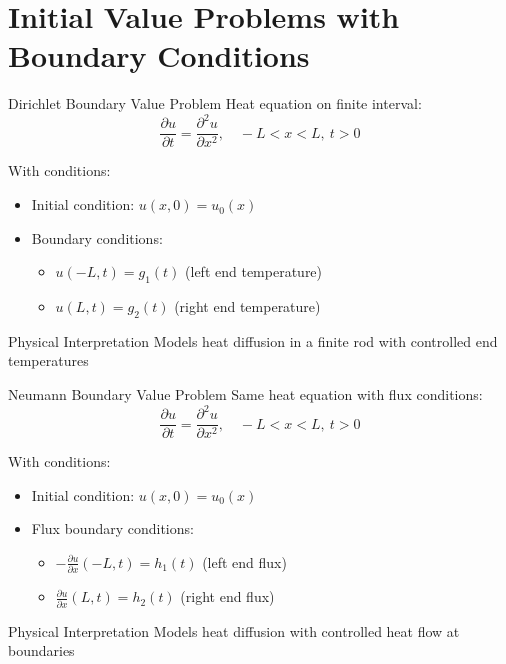 \documentclass{beamer}
\begin{document}
\section{Initial Value Problems with Boundary Conditions}

\begin{frame}{Dirichlet Boundary Value Problem}
    Heat equation on finite interval:
    \[
    \frac{\partial u}{\partial t} = \frac{\partial^2 u}{\partial x^2}, \quad -L < x < L, \ t > 0
    \]
    
    With conditions:
    \begin{itemize}
        \item Initial condition: $u(x,0) = u_0(x)$
        \item Boundary conditions:
        \begin{itemize}
            \item $u(-L,t) = g_1(t)$ (left end temperature)
            \item $u(L,t) = g_2(t)$ (right end temperature)
        \end{itemize}
    \end{itemize}
    
    \begin{block}{Physical Interpretation}
        Models heat diffusion in a finite rod with controlled end temperatures
    \end{block}
\end{frame}

\begin{frame}{Neumann Boundary Value Problem}
    Same heat equation with flux conditions:
    \[
    \frac{\partial u}{\partial t} = \frac{\partial^2 u}{\partial x^2}, \quad -L < x < L, \ t > 0
    \]
    
    With conditions:
    \begin{itemize}
        \item Initial condition: $u(x,0) = u_0(x)$
        \item Flux boundary conditions:
        \begin{itemize}
            \item $-\frac{\partial u}{\partial x}(-L,t) = h_1(t)$ (left end flux)
            \item $\frac{\partial u}{\partial x}(L,t) = h_2(t)$ (right end flux)
        \end{itemize}
    \end{itemize}
    
    \begin{block}{Physical Interpretation}
        Models heat diffusion with controlled heat flow at boundaries
    \end{block}
\end{frame}
\end{document}
